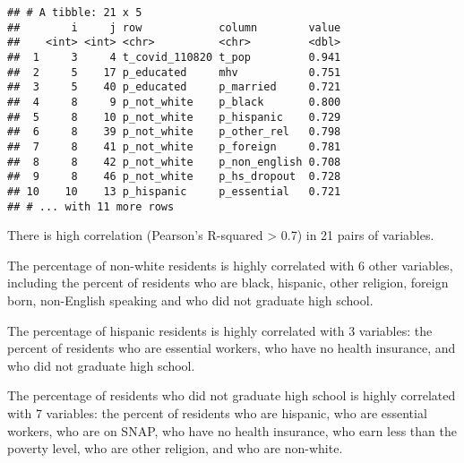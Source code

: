\documentclass[
]{article}
\newenvironment{Shaded}{\begin{snugshade}}{\end{snugshade}}
\newcommand{\DecValTok}[1]{\textcolor[rgb]{0.00,0.00,0.81}{#1}}
\newcommand{\FloatTok}[1]{\textcolor[rgb]{0.00,0.00,0.81}{#1}}
\newcommand{\KeywordTok}[1]{\textcolor[rgb]{0.13,0.29,0.53}{\textbf{#1}}}
\newcommand{\NormalTok}[1]{#1}
\newcommand{\OperatorTok}[1]{\textcolor[rgb]{0.81,0.36,0.00}{\textbf{#1}}}
\newcommand{\StringTok}[1]{\textcolor[rgb]{0.31,0.60,0.02}{#1}}
\begin{document}
\begin{Shaded}
\end{Shaded}

\begin{verbatim}
## # A tibble: 21 x 5
##        i     j row            column        value
##    <int> <int> <chr>          <chr>         <dbl>
##  1     3     4 t_covid_110820 t_pop         0.941
##  2     5    17 p_educated     mhv           0.751
##  3     5    40 p_educated     p_married     0.721
##  4     8     9 p_not_white    p_black       0.800
##  5     8    10 p_not_white    p_hispanic    0.729
##  6     8    39 p_not_white    p_other_rel   0.798
##  7     8    41 p_not_white    p_foreign     0.781
##  8     8    42 p_not_white    p_non_english 0.708
##  9     8    46 p_not_white    p_hs_dropout  0.728
## 10    10    13 p_hispanic     p_essential   0.721
## # ... with 11 more rows
\end{verbatim}

There is high correlation (Pearson's R-squared \textgreater{} 0.7) in 21
pairs of variables.

The percentage of non-white residents is highly correlated with 6 other
variables, including the percent of residents who are black, hispanic,
other religion, foreign born, non-English speaking and who did not
graduate high school.

The percentage of hispanic residents is highly correlated with 3
variables: the percent of residents who are essential workers, who have
no health insurance, and who did not graduate high school.

The percentage of residents who did not graduate high school is highly
correlated with 7 variables: the percent of residents who are hispanic,
who are essential workers, who are on SNAP, who have no health
insurance, who earn less than the poverty level, who are other religion,
and who are non-white.

\begin{Shaded}
\end{Shaded}
\end{document}
